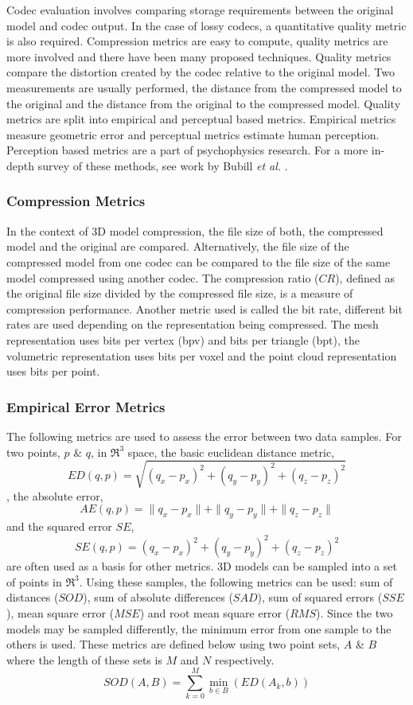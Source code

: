 Codec evaluation involves comparing storage requirements between the original model and codec output. In the case of lossy codecs, a quantitative quality metric is also required. Compression metrics are easy to compute, quality metrics are more involved and there have been many proposed techniques. Quality metrics compare the distortion created by the codec relative to the original model. Two measurements are usually performed, the distance from the compressed model to the original and the distance from the original to the compressed model. Quality metrics are split into empirical and perceptual based metrics. Empirical metrics measure geometric error and perceptual metrics estimate human perception. Perception based metrics are a part of psychophysics research. For a more in-depth survey of these methods, see work by Bubill \textit{et al.} \cite{Bulbul11Assessing}.

\subsubsection{Compression Metrics}

In the context of 3D model compression, the file size of both, the compressed model and the original are compared. Alternatively, the file size of the compressed model from one codec can be compared to the file size of the same model compressed using another codec. The compression ratio ($CR$), defined as the original file size divided by the compressed file size, is a measure of compression performance. Another metric used is called the bit rate, different bit rates are used depending on the representation being compressed. The mesh representation uses bits per vertex (bpv) and bits per triangle (bpt), the volumetric representation uses bits per voxel and the point cloud representation uses bits per point.

\subsubsection{Empirical Error Metrics}

The following metrics are used to assess the error between two data samples. For two points, $p$ \& $q$, in $\Re^3$ space, the basic euclidean distance metric,
$$
ED(q,p) = \sqrt{(q_x - p_x)^2 + (q_y - p_y)^2 + (q_z - p_z)^2}
$$,
the absolute error,
$$
AE(q,p) = \|q_x - p_x\| + \|q_y - p_y\| + \|q_z - p_z\|
$$
and the squared error $SE$, 
$$
SE(q,p) = (q_x - p_x)^2 + (q_y - p_y)^2 + (q_z - p_z)^2
$$
are often used as a basis for other metrics. 3D models can be sampled into a set of points in $\Re^3$. Using these samples, the following metrics can be used: sum of distances ($SOD$), sum of absolute differences ($SAD$), sum of squared errors ($SSE$), mean square error ($MSE$) and root mean square error ($RMS$). Since the two models may be sampled differently, the minimum error from one sample to the others is used. These metrics are defined below using two point sets, $A$ \& $B$ where the length of these sets is $M$ and $N$ respectively.
$$
SOD(A,B) = \sum_{k=0}^{M} \min_{b \in B}(ED(A_k,b))
$$

